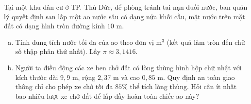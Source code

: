 \begin{bt}%
Tại một khu dân cư ở TP. Thủ Đức, để phòng tránh tai nạn đuối nước, ban quản lý quyết định san lấp một ao nước sâu có dạng nửa khối cầu, mặt nước trên mặt đất có dạng hình tròn đường kính $10\text{ m}$.
\begin{enumerate}[a)]
    \item Tính dung tích nước tối đa của ao theo đơn vị $\text{m}^3$ (kết quả làm tròn đến chữ số thập phân thứ nhất). Lấy $\pi \approx 3{,}1416$.
    \item Người ta điều động các xe ben chở đất có lòng thùng hình hộp chữ nhật với kích thước dài $9{,}9\text{ m}$, rộng $2{,}37\text{ m}$ và cao $0{,}85\text{ m}$. Quy định an toàn giao thông chỉ cho phép xe chở tối đa $85\%$ thể tích lòng thùng. Hỏi cần ít nhất bao nhiêu lượt xe chở đất để lấp đầy hoàn toàn chiếc ao này?
\end{enumerate}
\end{bt}

